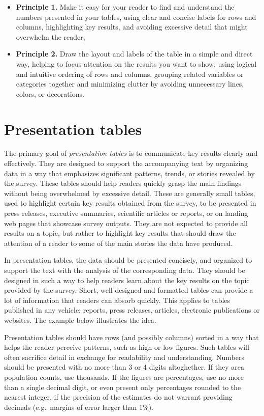 \documentclass[
  12pt,
]{book}
\begin{document}
\begin{itemize}
\item
  \textbf{Principle 1.} Make it easy for your reader to find and understand the numbers presented in your tables, using clear and concise labels for rows and columns,
  highlighting key results, and avoiding excessive detail that might overwhelm the reader;
\item
  \textbf{Principle 2.} Draw the layout and labels of the table in a simple and direct way, helping to focus attention on the results you want to show, using logical and intuitive ordering of rows and columns, grouping related variables or categories together and minimizing clutter by avoiding unnecessary lines, colors, or decorations.
\end{itemize}

\hypertarget{presentation-tables}{%
\section{Presentation tables}\label{presentation-tables}}

The primary goal of \emph{presentation tables} is to communicate key results clearly and effectively. They are designed to support the accompanying text by organizing data in a way that emphasizes significant patterns, trends, or stories revealed by the survey. These tables should help readers quickly grasp the main findings without being overwhelmed by excessive detail. These are generally small tables, used to highlight certain key results obtained from the survey, to be presented in press releases, executive summaries, scientific articles or reports, or on landing web pages that showcase survey outputs. They are not expected to provide all results on a topic, but rather to highlight key results that should draw the attention of a reader to some of the main stories the data have produced.

In presentation tables, the data should be presented concisely, and organized to support the text with the analysis of the corresponding data. They should be designed in such a way to help readers learn about the key results on the topic provided by the survey. Short, well-designed and formatted tables can provide a lot of information that readers can absorb quickly. This applies to tables published in any vehicle: reports, press releases, articles, electronic publications or websites. The example below illustrates the idea.

Presentation tables should have rows (and possibly columns) sorted in a way that helps the reader perceive patterns, such as high or low figures. Such tables will often sacrifice detail in exchange for readability and understanding. Numbers should be presented with no more than 3 or 4 digits altoghether. If they area population counts, use thousands. If the figures are percentages, use no more than a single decimal digit, or even present only percentages rounded to the nearest integer, if the precision of the estimates do not warrant providing decimals (e.g.~margins of error larger than 1\%).
\end{document}
